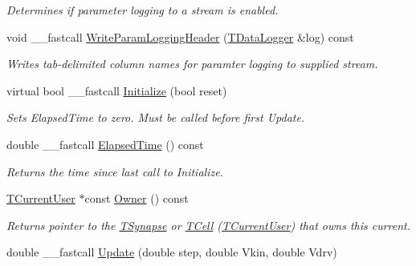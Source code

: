 \begin{DoxyCompactItemize}
\begin{DoxyCompactList}\small\item\em Determines if parameter logging to a stream is enabled. \end{DoxyCompactList}\item 
void \+\_\+\+\_\+fastcall \hyperlink{class_t_current_aa1a3048a0b415cdcf82e9138e7d5f767}{Write\+Param\+Logging\+Header} (\hyperlink{class_t_data_logger}{T\+Data\+Logger} \&log) const 
\begin{DoxyCompactList}\small\item\em Writes tab-\/delimited column names for paramter logging to supplied stream. \end{DoxyCompactList}\item 
virtual bool \+\_\+\+\_\+fastcall \hyperlink{class_t_current_a00c70d232ae85a9841d8d07e5770b7bd}{Initialize} (bool reset)
\begin{DoxyCompactList}\small\item\em Sets Elapsed\+Time to zero. Must be called before first Update. \end{DoxyCompactList}\item 
\hypertarget{class_t_current_acfbd183ae13073406964b9cd826e780c}{double \+\_\+\+\_\+fastcall \hyperlink{class_t_current_acfbd183ae13073406964b9cd826e780c}{Elapsed\+Time} () const }\label{class_t_current_acfbd183ae13073406964b9cd826e780c}

\begin{DoxyCompactList}\small\item\em Returns the time since last call to Initialize. \end{DoxyCompactList}\item 
\hypertarget{class_t_current_acc5b4bf46750821c5a75e42278c38929}{\hyperlink{class_t_current_user}{T\+Current\+User} $\ast$const \hyperlink{class_t_current_acc5b4bf46750821c5a75e42278c38929}{Owner} () const }\label{class_t_current_acc5b4bf46750821c5a75e42278c38929}

\begin{DoxyCompactList}\small\item\em Returns pointer to the \hyperlink{class_t_synapse}{T\+Synapse} or \hyperlink{class_t_cell}{T\+Cell} (\hyperlink{class_t_current_user}{T\+Current\+User}) that owns this current. \end{DoxyCompactList}\item 
\hypertarget{class_t_current_a31d02f0a83f4f46906a20b4c18866d99}{double \+\_\+\+\_\+fastcall \hyperlink{class_t_current_a31d02f0a83f4f46906a20b4c18866d99}{Update} (double step, double Vkin, double Vdrv)}\label{class_t_current_a31d02f0a83f4f46906a20b4c18866d99}


\end{DoxyCompactItemize}
